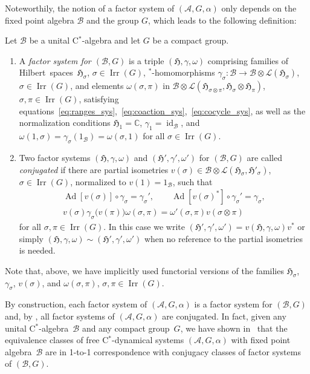 \documentclass[10pt,a4paper]{amsart}
\numberwithin{equation}{section}
\newcommand*{\C}{\mathbb C}		%
\newcommand*{\tensor}{\otimes}		%
\DeclareMathOperator{\id}{id}		%
\DeclareMathOperator{\Ad}{Ad}		%
\newcommand*{\Star}{$^*$\nobreakdash}
\newcommand*{\hilb}{\mathfrak}		%
\newcommand*{\alg}{\mathcal}		%
\newcommand*{\hH}{\hilb{H}}			%
\newcommand*{\one}{1}				%
\newcommand*{\aA}{\alg{A}}			%
\newcommand*{\aB}{\alg{B}} 			%
\newcommand*{\End}{\mathcal{L}} %
\DeclareMathOperator{\Irrep}{Irr} 			%
\begin{document}
Noteworthily, the notion of a factor system of $(\aA, G, \alpha)$ only depends on the fixed point algebra $\aB$ and the group $G$, which leads to the following definition:

\begin{Definition}\label{def:conjugancy}
	Let $\aB$ be a unital C\Star-algebra and let $G$ be a compact group.
	\begin{enumerate}\itemsep=0pt
	\item 		
		A \emph{factor system for $(\aB,G)$} is a triple $(\hH, \gamma, \omega)$ comprising families of Hilbert~spaces~$\hH_\sigma$, $\sigma \in \Irrep(G)$, \Star-homomorphisms $\gamma_\sigma\colon \aB \to \aB \tensor \End(\hH_\sigma)$, $\sigma \in \Irrep(G)$, and elements $\omega(\sigma, \pi)$ in $\aB \tensor \End(\hH_{\sigma \tensor \pi}, \hH_\sigma \tensor \hH_\pi)$, $\sigma, \pi\in \Irrep(G)$, satisfying equations~\eqref{eq:ranges_sys},~\eqref{eq:coaction_sys},~\eqref{eq:cocycle_sys}, as well as the normalization conditions $\hH_1 = \C$, $\gamma_1 = \id_\aB$, and $\omega(1, \sigma) = \gamma_\sigma(\one_\aB) = \omega(\sigma, 1)$ for all $\sigma \in \Irrep(G)$.
	\item
		Two factor systems $(\hH, \gamma, \omega)$ and $(\hH', \gamma', \omega')$ for $(\aB,G)$ are called \emph{conjugated} if there are partial isometries $v(\sigma) \in \aB \tensor \End(\hH_\sigma,\hH'_\sigma)$, $\sigma \in \Irrep(G)$, normalized to $v(1) = \one_\aB$, such that
		\begin{gather*}
			\Ad[v(\sigma)] \circ \gamma_\sigma = \gamma_\sigma',
			\qquad
			\Ad[v(\sigma)^*] \circ \gamma_\sigma' = \gamma_\sigma,		\\
			v(\sigma) \gamma_\sigma\bigl( v(\pi) \bigr) \omega(\sigma, \pi)
			= \omega'(\sigma, \pi) v(\sigma \tensor \pi)
		\end{gather*}
		for all $\sigma, \pi \in \Irrep(G)$.
		In this case we write $(\hH',\gamma', \omega') = v(\hH, \gamma, \omega)v^*$ or simply $(\hH,\gamma, \omega) \sim (\hH', \gamma', \omega')$ when no reference to the partial isometries is needed.
	\end{enumerate}
Note that, above, we have implicitly used functorial versions of the families $\hH_\sigma$, $\gamma_\sigma$, $v(\sigma)$, and $\omega(\sigma, \pi)$, $\sigma, \pi \in \Irrep(G)$.
\end{Definition}

By construction, each factor system of $(\aA,G,\alpha)$ is a factor system for $(\aB,G)$ and, by \cite[Lemma~4.3]{SchWa17c}, all factor systems of $(\aA, G, \alpha)$ are conjugated. In fact, given any unital C\Star\nobreakdash-algebra~$\aB$ and any compact group~$G$, we have shown in~\cite[Section~5]{SchWa17c} that the equivalence classes of free C\Star-dynamical systems $(\aA, G, \alpha)$ with fixed point algebra~$\aB$ are in 1-to-1 correspondence with conjugacy classes of factor systems of $(\aB,G)$.
\end{document}
